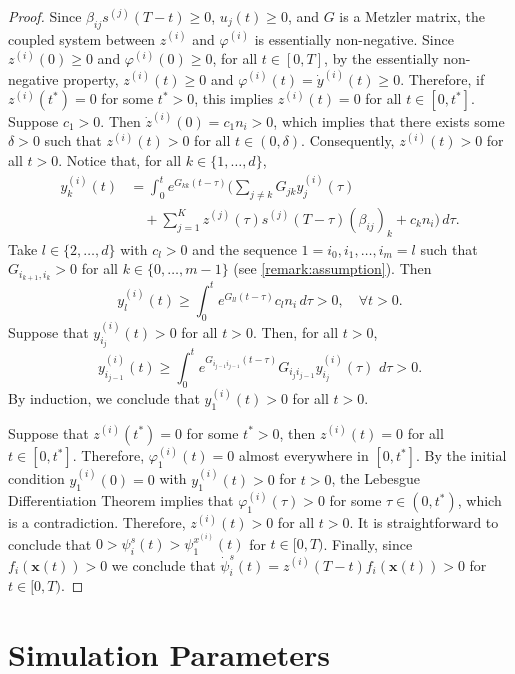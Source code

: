 \documentclass[letterpaper, 10 pt, conference]{ieeeconf}
\begin{document}
\begin{proof}
Since $\beta_{ij}s^{(j)}(T-t) \ge 0$, $u_j(t) \ge 0$, and $G$ is a Metzler matrix, the coupled system between $z^{(i)}$ and $\varphi^{(i)}$ is essentially non-negative.
Since $z^{(i)}(0) \ge 0$ and $\varphi^{(i)}(0) \ge 0$, for all $t \in [0,T]$, by the essentially non-negative property, $z^{(i)}(t) \ge 0$ and $\varphi^{(i)}(t) = \dot{y}^{(i)}(t) \ge 0$.
Therefore, if $z^{(i)}(t^*) = 0$ for some $t^* > 0$, this implies $z^{(i)}(t) = 0$ for all $t \in [0,t^*]$.
Suppose $c_1 > 0$.
Then $\dot{z}^{(i)}(0) = c_1 n_i > 0$, which implies that there exists some $\delta > 0$ such that $z^{(i)}(t) > 0$ for all $t \in (0,\delta)$.
Consequently, $z^{(i)}(t) > 0$ for all $t > 0$.
Notice that, for all $k \in \{1,\dots, d\}$, 
\begin{equation*}
\begin{aligned}
    y_{k}^{(i)}(t) &= \int_0^t e^{G_{kk}(t-\tau)} \bigg( 
    \sum_{j\neq k} G_{jk} y_j^{(i)}(\tau) \\
    &\quad + \sum_{j=1}^K z^{(j)}(\tau) s^{(j)}(T-\tau) (\beta_{ij})_k 
    + c_k n_i \bigg) \, d\tau.
\end{aligned}
\end{equation*}
Take $l \in \{2,\dots,d\}$ with $c_l > 0$ and the sequence $1=i_0, i_1,\dots,i_m=l$ such that $G_{i_{k+1}, i_k} > 0$ for all $k \in \{0,\dots,m-1\}$ (see \autoref{remark:assumption}).
Then
\[
y_{l}^{(i)}(t) \ge \int_0^t e^{G_{ll}(t-\tau)} c_l n_i \, d\tau > 0, \quad \forall t > 0.
\]
Suppose that $y_{i_j}^{(i)}(t) > 0$ for all $t > 0$.
Then, for all $t>0$,
\[
y_{i_{j-1}}^{(i)}(t) \ge \int_0^t e^{G_{i_{j-1} i_{j-1}}(t-\tau)} G_{i_j i_{j-1} }y^{(i)}_{i_j}(\tau) \, \, d \tau > 0.
\]
By induction, we conclude that $y_1^{(i)}(t) > 0$ for all $t > 0$.

Suppose that $z^{(i)}(t^*) = 0$ for some $t^* > 0$, then $z^{(i)}(t) = 0$ for all $t \in [0,t^*]$.
Therefore, $\varphi_1^{(i)}(t) = 0$ almost everywhere in $[0,t^*]$.
By the initial condition $y_1^{(i)}(0) = 0$ with $y_1^{(i)}(t) > 0$ for $t > 0$, the Lebesgue Differentiation Theorem implies that $\varphi_1^{(i)}(\tau) > 0$ for some $\tau \in (0,t^*)$, which is a contradiction.
Therefore, $z^{(i)}(t) > 0$ for all $t > 0$.
It is straightforward to conclude that $0 > \psi_i^s(t) > \psi_1^{x^{(i)}}(t)$ for $t \in [0,T)$.
Finally, since $f_i(\boldsymbol{x}(t)) > 0$ we conclude that $\dot{\psi}_i^s(t) = z^{(i)}(T-t) f_i(\boldsymbol{x}(t)) > 0$ for $t \in [0,T)$.
\end{proof}

\section*{Simulation Parameters}
\label{appendix:parameters}
\end{document}
